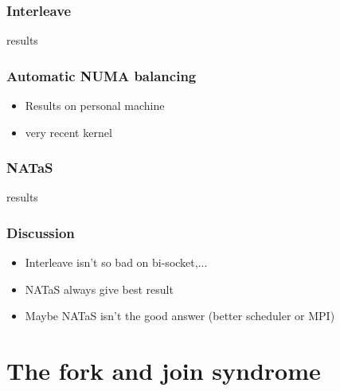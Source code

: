 \documentclass[oneside,12t]{classes/Thesis}
\begin{document}
\subsection{Interleave}
results
\subsection{Automatic NUMA balancing}
  \begin{itemize}
    \item Results on personal machine
    \item very recent kernel
  \end{itemize}
\subsection{NATaS}
results
\subsection{Discussion}
  \begin{itemize}
    \item Interleave isn't so bad on bi-socket,...
    \item NATaS always give best result
    \item Maybe NATaS isn't the good answer (better scheduler or MPI)
  \end{itemize}


\chapter{The fork and join syndrome}
\minitoc
\vspace{1cm}
\end{document}
